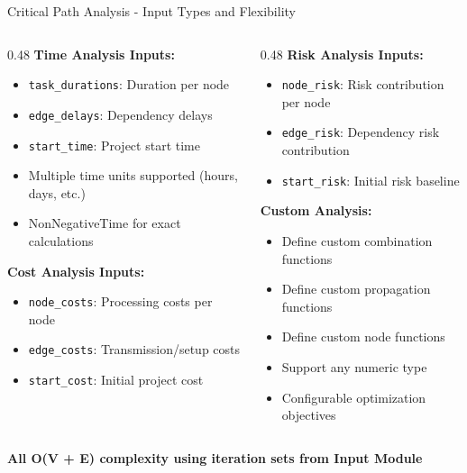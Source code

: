 \documentclass[aspectratio=169]{beamer}
\begin{document}
\begin{frame}{\textcolor{juliablue}{Critical Path Analysis - Input Types and Flexibility}}

\begin{columns}
\begin{column}{0.48\textwidth}
\textbf{\textcolor{juliagreen}{Time Analysis Inputs:}}
\begin{itemize}
\item \texttt{task\_durations}: Duration per node
\item \texttt{edge\_delays}: Dependency delays
\item \texttt{start\_time}: Project start time
\item Multiple time units supported (hours, days, etc.)
\item NonNegativeTime for exact calculations
\end{itemize}

\vspace{0.3cm}
\textbf{\textcolor{juliablue}{Cost Analysis Inputs:}}
\begin{itemize}
\item \texttt{node\_costs}: Processing costs per node
\item \texttt{edge\_costs}: Transmission/setup costs
\item \texttt{start\_cost}: Initial project cost
\end{itemize}
\end{column}

\begin{column}{0.48\textwidth}
\textbf{\textcolor{juliared}{Risk Analysis Inputs:}}
\begin{itemize}
\item \texttt{node\_risk}: Risk contribution per node
\item \texttt{edge\_risk}: Dependency risk contribution
\item \texttt{start\_risk}: Initial risk baseline
\end{itemize}

\vspace{0.3cm}
\textbf{\textcolor{juliapurple}{Custom Analysis:}}
\begin{itemize}
\item Define custom combination functions
\item Define custom propagation functions
\item Define custom node functions
\item Support any numeric type
\item Configurable optimization objectives
\end{itemize}
\end{column}
\end{columns}

\vspace{0.3cm}
\begin{center}
\textbf{All \textcolor{juliagreen}{O(V + E)} complexity using iteration sets from Input Module}
\end{center}
\end{frame}
\end{document}
